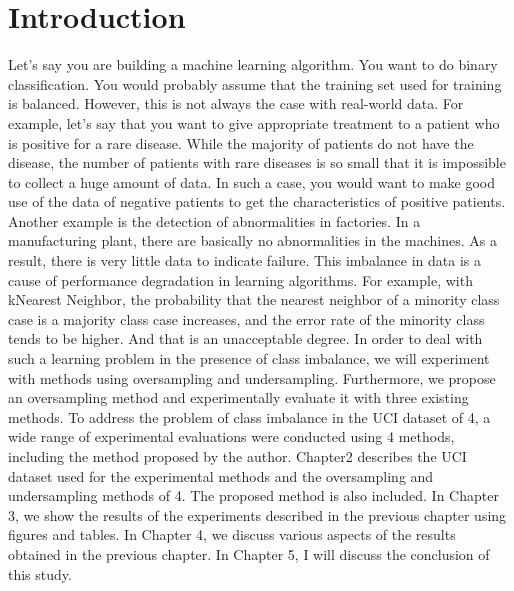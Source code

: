 \chapter{Introduction}

Let's say you are building a machine learning algorithm.
You want to do binary classification.
You would probably assume that the training set used for training is balanced.
However, this is not always the case with real-world data.
For example, let's say that you want to give appropriate treatment to a patient who is positive for a rare disease.
While the majority of patients do not have the disease, the number of patients with rare diseases is so small that it is impossible to collect a huge amount of data.
In such a case, you would want to make good use of the data of negative patients to get the characteristics of positive patients.
Another example is the detection of abnormalities in factories.
In a manufacturing plant, there are basically no abnormalities in the machines. As a result, there is very little data to indicate failure.
This imbalance in data is a cause of performance degradation in learning algorithms.
For example, with kNearest Neighbor, the probability that the nearest neighbor of a minority class case is a majority class case increases, and the error rate of the minority class tends to be higher. And that is an unacceptable degree.
In order to deal with such a learning problem in the presence of class imbalance, we will experiment with methods using oversampling and undersampling.
Furthermore, we propose an oversampling method and experimentally evaluate it with three existing methods.
To address the problem of class imbalance in the UCI dataset\cite{UCI} of 4, a wide range of experimental evaluations were conducted using 4 methods, including the method proposed by the author.
Chapter2 describes the UCI dataset\cite{UCI} used for the experimental methods and the oversampling and undersampling methods of 4. The proposed method is also included.
In Chapter 3, we show the results of the experiments described in the previous chapter using figures and tables.
In Chapter 4, we discuss various aspects of the results obtained in the previous chapter.
In Chapter 5, I will discuss the conclusion of this study.

